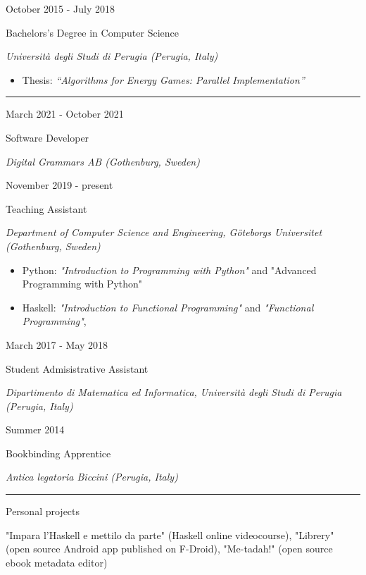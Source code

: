\documentclass[a4paper,10pt]{article}
\newlength{\cvcolumngapwidth}
\newlength{\cvleftcolumnwidth}
\newlength{\cvrightcolumnwidth}
\newcommand{\cvsectionstyle}[1]{{\normalsize\cvsectionfont\textcolor{cvsectioncolor}{#1}}}
\newcommand{\cvtitlestyle}[1]{{\large\cvtitlefont\textcolor{cvtitlecolor}{#1}}}
\newcommand{\cvdurationstyle}[1]{{\small\cvdurationfont\textcolor{cvdurationcolor}{#1}}}
\newcommand{\cvheadingstyle}[1]{{\normalsize\cvheadingfont\textcolor{cvheadingcolor}{#1}}}
\newlength{\cvafteritemskipamount}
\newlength{\cvaftersectionskipamount}
\newlength{\cvbetweensectionandheadingextraskipamount}
\newlength{\cvaftertitleskipamount}
\newlength{\cvparskip}
\newcommand{\cvsection}[1]{
    \begin{minipage}[t]{\cvleftcolumnwidth}
        \raggedleft\cvsectionstyle{#1}
    \end{minipage}%
    \hspace{\cvcolumngapwidth}%
    \begin{minipage}[t]{\cvrightcolumnwidth}
        \textcolor{cvrulecolor}{\rule{\cvrightcolumnwidth}{0.3mm}}
    \end{minipage}

    \vspace{\cvaftersectionskipamount}
}
\newcommand{\cvitem}[2]{
    \begin{minipage}[t]{\cvleftcolumnwidth}
        \raggedleft #1
    \end{minipage}%
    \hspace{\cvcolumngapwidth}%
    \begin{minipage}[t]{\cvrightcolumnwidth}
        \setlength{\parskip}{\cvparskip} #2
    \end{minipage}

    \vspace{\cvafteritemskipamount}
}
\newcommand{\cvtitle}[1]{
    \cvtitlestyle{#1}

    \vspace{\cvaftertitleskipamount}
    \vspace{-\cvparskip}
}
\begin{document}
\cvitem{
    \cvdurationstyle{October 2015 - July 2018}
}{
    \cvtitle{Bachelors's Degree in Computer Science}
    
    \textit{Università degli Studi di Perugia (Perugia, Italy)}

    \begin{itemize}[leftmargin=*]
        \item Thesis: \textit{``Algorithms for Energy Games: Parallel Implementation''}
    \end{itemize}
}


\cvsection{WORK EXPERIENCE}

\cvitem{
    \cvdurationstyle{March 2021 - October 2021}
}{
    \cvtitle{Software Developer}

    \textit{Digital Grammars AB (Gothenburg, Sweden)}
}

\cvitem{
    \cvdurationstyle{November 2019 - present}
}{
    \cvtitle{Teaching Assistant}

    \textit{Department of Computer Science and Engineering, Göteborgs Universitet (Gothenburg, Sweden)} \
    \begin{itemize}[leftmargin=*]
    \item Python: \textit{"Introduction to Programming with Python"} and {"Advanced Programming with Python"}
    \item Haskell: \textit{"Introduction to Functional Programming"} and \textit{"Functional Programming"}, 
    \end{itemize}
}

\cvitem{
    \cvdurationstyle{March 2017 - May 2018}
}{
    \cvtitle{Student Admisistrative Assistant}

    \textit{Dipartimento di Matematica ed Informatica, Università degli Studi di Perugia (Perugia, Italy)}
    
}

\cvitem{
    \cvdurationstyle{Summer 2014}
}{
    \cvtitle{Bookbinding Apprentice}

    \textit{Antica legatoria Biccini (Perugia, Italy)}
}



\cvsection{OTHER RELEVANT EXPERIENCES}

\vspace{\cvbetweensectionandheadingextraskipamount}

\cvitem{
    \cvheadingstyle{Personal projects}
}{
    "Impara l'Haskell e mettilo da parte" (Haskell online videocourse), "Librery" (open source Android app published on F-Droid), "Me-tadah!" (open source ebook metadata editor)
}
\end{document}
